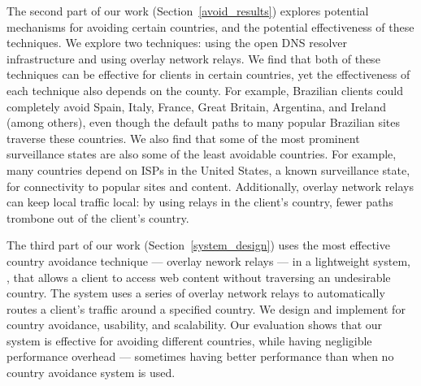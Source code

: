 The second part of our work (Section~\ref{avoid_results}) explores
potential mechanisms for avoiding certain countries, and the potential
effectiveness of these techniques.  We explore two techniques: using the
open DNS resolver infrastructure and using overlay network relays.  We
find that both of these techniques can be effective for clients in
certain countries, yet the effectiveness of each technique also depends
on the county.  For example, Brazilian clients could completely avoid
Spain, Italy, France, Great Britain, Argentina, and Ireland (among
others), even though the default paths to many popular Brazilian sites
traverse these countries. We also find that some of the most prominent surveillance states are
also some of the least avoidable countries.  For example, many countries
depend on ISPs in the United States, a known surveillance state, for
connectivity to popular sites and content.  Additionally, overlay network relays can keep
local traffic local: by using relays in the client's country, fewer
paths trombone out of the client's country.  

The third part of our work (Section~\ref{system_design}) uses the most effective
country avoidance technique --- overlay nework relays --- in a lightweight system, \system{}, that allows 
a client to access web content without traversing an undesirable country.  The 
system uses a series of overlay network relays to automatically routes a client's 
traffic around a specified country.  We design and implement \system{} for 
country avoidance, usability, and scalability.  Our evaluation shows that our system 
is effective for avoiding different countries, while having negligible performance overhead --- 
sometimes having better performance than when no country avoidance system is used.

